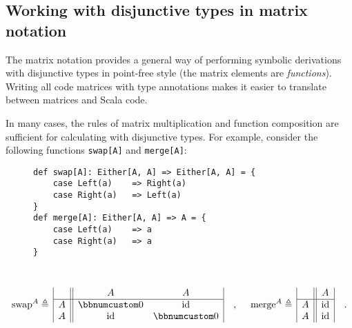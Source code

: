 \subsection{Working with disjunctive types in matrix notation\label{subsec:Working-with-disjunctive-functions}}

The matrix notation provides a general way of performing symbolic
derivations with disjunctive types in point-free style (the matrix
elements are \emph{functions}). Writing all code matrices with type
annotations makes it easier to translate between matrices and Scala
code.

In many cases, the rules of matrix multiplication and function composition
are sufficient for calculating with disjunctive types. For example,
consider the following functions \lstinline!swap[A]! and \lstinline!merge[A]!:

\begin{wrapfigure}{L}{0.46\columnwidth}%
\vspace{-0.85\baselineskip}
\begin{lstlisting}
def swap[A]: Either[A, A] => Either[A, A] = {
    case Left(a)    => Right(a)
    case Right(a)   => Left(a)
}
def merge[A]: Either[A, A] => A = {
    case Left(a)    => a
    case Right(a)   => a
}
\end{lstlisting}

\vspace{-1\baselineskip}
\end{wrapfigure}%

~\vspace{-1.2\baselineskip}
\[
\text{swap}^{A}\triangleq\,\begin{array}{|c||cc|}
 & A & A\\
\hline A & \bbnum 0 & \text{id}\\
A & \text{id} & \bbnum 0
\end{array}\quad,~\quad\text{merge}^{A}\triangleq\,\begin{array}{|c||c|}
 & A\\
\hline A & \text{id}\\
A & \text{id}
\end{array}\quad.
\]
\vspace{-0.4\baselineskip}

